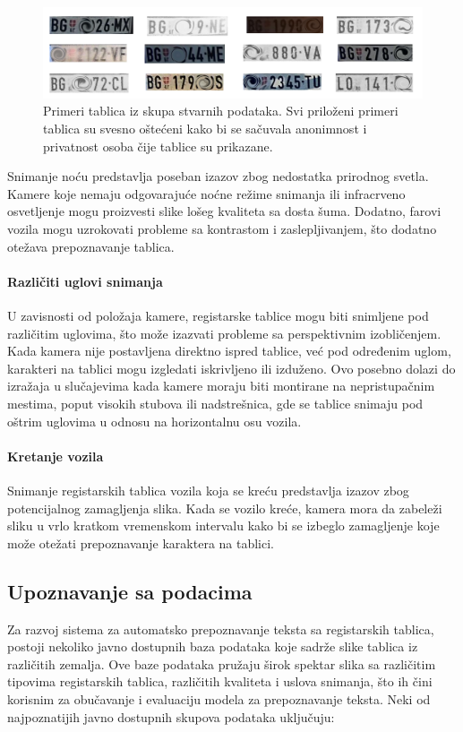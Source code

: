 \documentclass[a4paper,12pt]{article}
\begin{document}
	\begin{figure}[H]
		\centering
		\includegraphics[width=\textwidth]{assets/license-plate-samples.png}
		\caption{Primeri tablica iz skupa stvarnih podataka. Svi priloženi primeri tablica su svesno oštećeni kako bi se sačuvala anonimnost i privatnost osoba čije tablice su prikazane.}
		\label{fig:license-plate-samples}
	\end{figure}
	
	Snimanje noću predstavlja poseban izazov zbog nedostatka prirodnog svetla. Kamere koje nemaju odgovarajuće noćne režime snimanja ili infracrveno osvetljenje mogu proizvesti slike lošeg kvaliteta sa dosta šuma. Dodatno, farovi vozila mogu uzrokovati probleme sa kontrastom i zaslepljivanjem, što dodatno otežava prepoznavanje tablica.
	
	\paragraph{Različiti uglovi snimanja}
	U zavisnosti od položaja kamere, registarske tablice mogu biti snimljene pod različitim uglovima, što može izazvati probleme sa perspektivnim izobličenjem. Kada kamera nije postavljena direktno ispred tablice, već pod određenim uglom, karakteri na tablici mogu izgledati iskrivljeno ili izduženo. Ovo posebno dolazi do izražaja u slučajevima kada kamere moraju biti montirane na nepristupačnim mestima, poput visokih stubova ili nadstrešnica, gde se tablice snimaju pod oštrim uglovima u odnosu na horizontalnu osu vozila.
	
	\paragraph{Kretanje vozila}
	Snimanje registarskih tablica vozila koja se kreću predstavlja izazov zbog potencijalnog zamagljenja slika. Kada se vozilo kreće, kamera mora da zabeleži sliku u vrlo kratkom vremenskom intervalu kako bi se izbeglo zamagljenje koje može otežati prepoznavanje karaktera na tablici.
	
	\subsection{Upoznavanje sa podacima}
	Za razvoj sistema za automatsko prepoznavanje teksta sa registarskih tablica, postoji nekoliko javno dostupnih baza podataka koje sadrže slike tablica iz različitih zemalja. Ove baze podataka pružaju širok spektar slika sa različitim tipovima registarskih tablica, različitih kvaliteta i uslova snimanja, što ih čini korisnim za obučavanje i evaluaciju modela za prepoznavanje teksta. Neki od najpoznatijih javno dostupnih skupova podataka uključuju:
	
\end{document}
